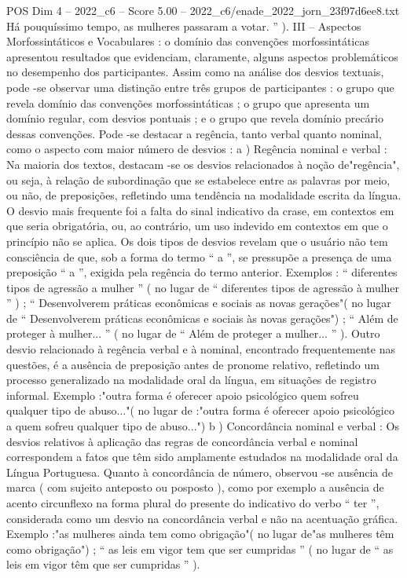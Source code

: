 \begin{textsample}{POS Dim 4 – 2022\_c6 – Score 5.00 – 2022\_c6/enade\_2022\_jorn\_23f97d6ee8.txt}
Há pouquíssimo tempo, as mulheres passaram a votar. ” ).
III – Aspectos Morfossintáticos e Vocabulares : o domínio das convenções morfossintáticas apresentou resultados que evidenciam, claramente, alguns aspectos problemáticos no desempenho dos participantes.
Assim como na análise dos desvios textuais, pode -se observar uma distinção entre três grupos de participantes : o grupo que revela domínio das convenções morfossintáticas ; o grupo que apresenta um domínio regular, com desvios pontuais ; e o grupo que revela domínio precário dessas convenções.
Pode -se destacar a regência, tanto verbal quanto nominal, como o aspecto com maior número de desvios : a ) Regência nominal e verbal : Na maioria dos textos, destacam -se os desvios relacionados à noção de"regência", ou seja, à relação de subordinação que se estabelece entre as palavras por meio, ou não, de preposições, refletindo uma tendência na modalidade escrita da língua.
O desvio mais frequente foi a falta do sinal indicativo da crase, em contextos em que seria obrigatória, ou, ao contrário, um uso indevido em contextos em que o princípio não se aplica.
Os dois tipos de desvios revelam que o usuário não tem consciência de que, sob a forma do termo “ a ”, se pressupõe a presença de uma preposição “ a ”, exigida pela regência do termo anterior.
Exemplos : “ diferentes tipos de agressão a mulher ” ( no lugar de “ diferentes tipos de agressão à mulher ” ) ; “ Desenvolverem práticas econômicas e sociais as novas gerações"( no lugar de “ Desenvolverem práticas econômicas e sociais às novas gerações") ; “ Além de proteger à mulher... ” ( no lugar de “ Além de proteger a mulher... ” ).
Outro desvio relacionado à regência verbal e à nominal, encontrado frequentemente nas questões, é a ausência de preposição antes de pronome relativo, refletindo um processo generalizado na modalidade oral da língua, em situações de registro informal.
Exemplo :"outra forma é oferecer apoio psicológico quem sofreu qualquer tipo de abuso..."( no lugar de :"outra forma é oferecer apoio psicológico a quem sofreu qualquer tipo de abuso...") b ) Concordância nominal e verbal : Os desvios relativos à aplicação das regras de concordância verbal e nominal correspondem a fatos que têm sido amplamente estudados na modalidade oral da Língua Portuguesa.
Quanto à concordância de número, observou -se ausência de marca ( com sujeito anteposto ou posposto ), como por exemplo a ausência de acento circunflexo na forma plural do presente do indicativo do verbo “ ter ”, considerada como um desvio na concordância verbal e não na acentuação gráfica.
Exemplo :"as mulheres ainda tem como obrigação"( no lugar de"as mulheres têm como obrigação") ; “ as leis em vigor tem que ser cumpridas ” ( no lugar de “ as leis em vigor têm que ser cumpridas ” ).

\end{textsample}
